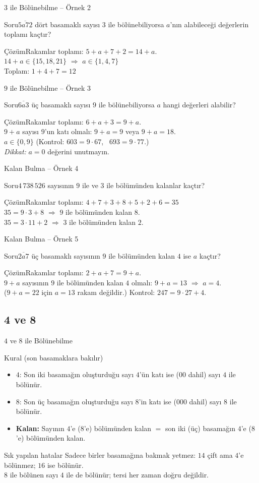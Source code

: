 \documentclass[aspectratio=169,11pt,handout]{beamer}
\newcommand{\soru}[3]{%
\begin{frame}{#1}
  \begin{block}{Soru}\large #2\end{block}
  \pause
  \begin{exampleblock}{Çözüm}\large #3\end{exampleblock}
\end{frame}}
\newcommand{\ab}[1]{\overline{#1}}
\begin{document}
\soru{\(3\) ile Bölünebilme -- Örnek 2}
{\(\ab{5a72}\) dört basamaklı sayısı \(3\) ile bölünebiliyorsa \(a\)'nın alabileceği değerlerin toplamı kaçtır?}
{Rakamlar toplamı: \(5+a+7+2=14+a\).\\[3pt]
\(14+a\in\{15,18,21\}\) \(\Rightarrow\) \(a\in\{1,4,7\}\)\\[3pt]
Toplam: \(1+4+7=12\)}

\soru{\(9\) ile Bölünebilme -- Örnek 3}
{\(\ab{6a3}\) üç basamaklı sayısı \(9\) ile bölünebiliyorsa \(a\) hangi değerleri alabilir?}
{Rakamlar toplamı: \(6+a+3=9+a\).\\[3pt]
\(9+a\) sayısı \(9\)'un katı olmalı: \(9+a=9\) veya \(9+a=18\).\\[3pt]
\(a\in\{0,9\}\) \quad (Kontrol: \(603=9\cdot 67\), \ \(693=9\cdot 77\).)\\[3pt]
\textit{Dikkat:} \(a=0\) değerini unutmayın.}

\soru{Kalan Bulma -- Örnek 4}
{\(4\,738\,526\) sayısının \(9\) ile ve \(3\) ile bölümünden kalanlar kaçtır?}
{Rakamlar toplamı: \(4+7+3+8+5+2+6=35\)\\[3pt]
\(35=9\cdot 3+8\) \(\Rightarrow\) \(9\) ile bölümünden kalan \(8\).\\[3pt]
\(35=3\cdot 11+2\) \(\Rightarrow\) \(3\) ile bölümünden kalan \(2\).}

\soru{Kalan Bulma -- Örnek 5}
{\(\ab{2a7}\) üç basamaklı sayısının \(9\) ile bölümünden kalan \(4\) ise \(a\) kaçtır?}
{Rakamlar toplamı: \(2+a+7=9+a\).\\[3pt]
\(9+a\) sayısının \(9\) ile bölümünden kalan \(4\) olmalı: \(9+a=13\) \(\Rightarrow\) \(a=4\).\\[3pt]
(\(9+a=22\) için \(a=13\) rakam değildir.) \quad Kontrol: \(247=9\cdot 27+4\).}

\subsection{4 ve 8}
\begin{frame}{\(4\) ve \(8\) ile Bölünebilme}
\begin{block}{Kural (son basamaklara bakılır)}
\begin{itemize}
\item \(4\): Son iki basamağın oluşturduğu sayı \(4\)'ün katı ise (\(00\) dahil) sayı \(4\) ile bölünür.
\item \(8\): Son üç basamağın oluşturduğu sayı \(8\)'in katı ise (\(000\) dahil) sayı \(8\) ile bölünür.
\item \textbf{Kalan:} Sayının \(4\)'e (\(8\)'e) bölümünden kalan \(=\) son iki (üç) basamağın \(4\)'e (\(8\)'e) bölümünden kalan.
\end{itemize}
\end{block}
\begin{alertblock}{Sık yapılan hatalar}
Sadece birler basamağına bakmak yetmez: \(14\) çift ama \(4\)'e bölünmez; \(16\) ise bölünür.\\
\(8\) ile bölünen sayı \(4\) ile de bölünür; tersi her zaman doğru değildir.
\end{alertblock}
\end{frame}
\end{document}
